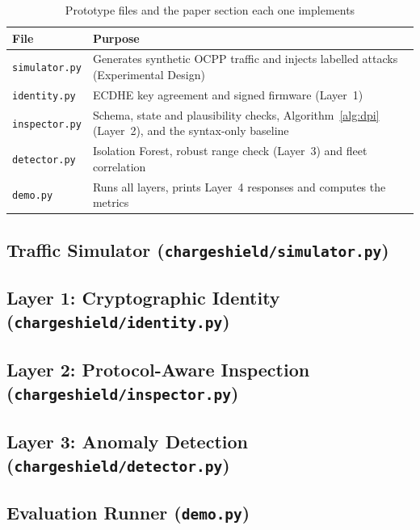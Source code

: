 \documentclass[runningheads]{llncs}
\begin{document}
\begin{table}[h]
\centering
\caption{Prototype files and the paper section each one implements}
\footnotesize
\begin{tabularx}{\textwidth}{@{}l X@{}}
\toprule
\textbf{File} & \textbf{Purpose}\\
\midrule
\texttt{simulator.py} & Generates synthetic OCPP traffic and injects labelled attacks (Experimental Design)\\
\texttt{identity.py} & ECDHE key agreement and signed firmware (Layer~1)\\
\texttt{inspector.py} & Schema, state and plausibility checks, Algorithm~\ref{alg:dpi} (Layer~2), and the syntax-only baseline\\
\texttt{detector.py} & Isolation Forest, robust range check (Layer~3) and fleet correlation\\
\texttt{demo.py} & Runs all layers, prints Layer~4 responses and computes the metrics\\
\bottomrule
\end{tabularx}
\end{table}

\subsection{Traffic Simulator (\texttt{chargeshield/simulator.py})}


\subsection{Layer 1: Cryptographic Identity (\texttt{chargeshield/identity.py})}


\subsection{Layer 2: Protocol-Aware Inspection (\texttt{chargeshield/inspector.py})}


\subsection{Layer 3: Anomaly Detection (\texttt{chargeshield/detector.py})}


\subsection{Evaluation Runner (\texttt{demo.py})}

\end{document}
